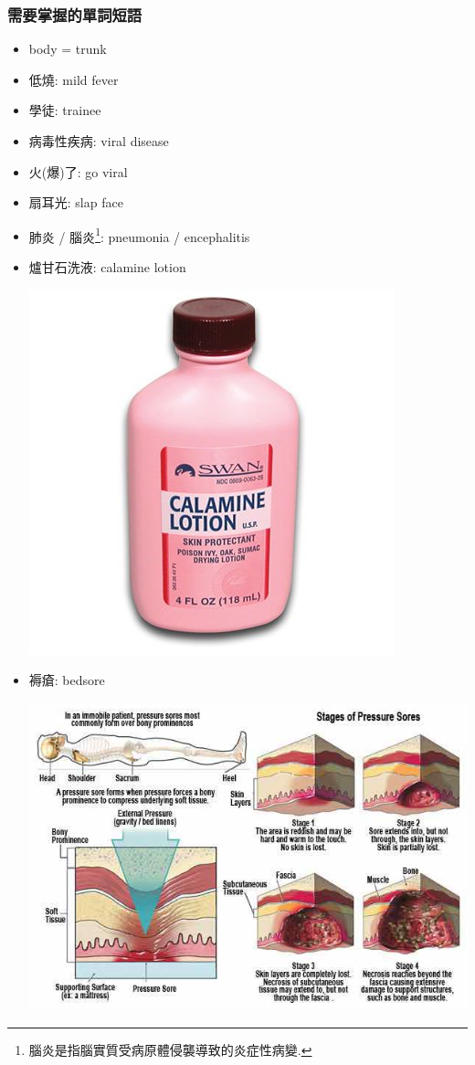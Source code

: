 \subsubsection*{需要掌握的單詞短語}
\begin{multicols}{2}
\begin{itemize}
  \itemsep0em
  \item body = trunk
  \item 低燒: mild fever
  \item 學徒: trainee
  \item 病毒性疾病: viral disease
  \item 火(爆)了: go viral
  \item 扇耳光: slap  face
  \item 肺炎 / 腦炎\footnote{腦炎是指腦實質受病原體侵襲導致的炎症性病變.}: pneumonia / encephalitis
  \item 爐甘石洗液: calamine lotion
  \begin{center}
    \includegraphics[scale=.4]{pics/calamine-lotion}
  \end{center}
  \item 褥瘡: bedsore
  \begin{center}
    \includegraphics[scale=.4]{pics/bedsore}

\end{center}
\end{itemize}
\end{multicols}
